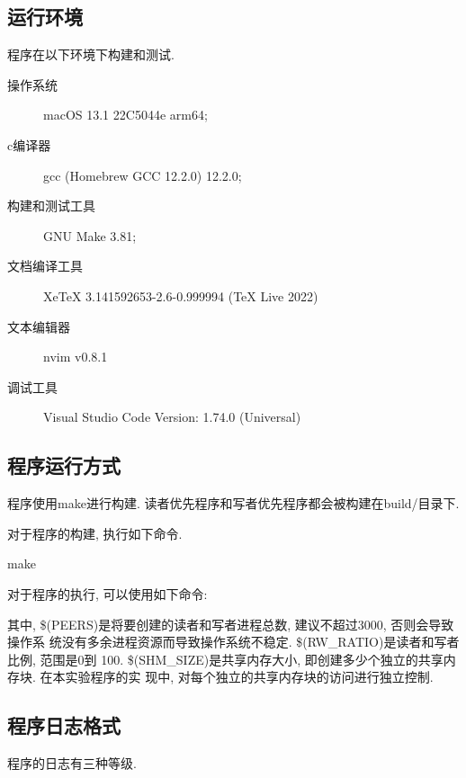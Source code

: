 \subsection{运行环境}
程序在以下环境下构建和测试.
\begin{description}
    \item[操作系统] macOS 13.1 22C5044e arm64;
    \item[c编译器] gcc (Homebrew GCC 12.2.0) 12.2.0;
    \item[构建和测试工具] GNU Make 3.81;
    \item[文档编译工具] XeTeX 3.141592653-2.6-0.999994 (TeX Live 2022)
    \item[文本编辑器] nvim v0.8.1
    \item[调试工具] Visual Studio Code Version: 1.74.0 (Universal)
\end{description}

\subsection{程序运行方式}
程序使用make进行构建. 读者优先程序和写者优先程序都会被构建在build/目录下.\par
对于程序的构建, 执行如下命令.
\begin{code}
    make
\end{code}

对于程序的执行, 可以使用如下命令:

其中, \$(PEERS)是将要创建的读者和写者进程总数, 建议不超过3000, 否则会导致操作系
统没有多余进程资源而导致操作系统不稳定. \$(RW\_RATIO)是读者和写者比例, 范围是0到
100. \$(SHM\_SIZE)是共享内存大小, 即创建多少个独立的共享内存块. 在本实验程序的实
现中, 对每个独立的共享内存块的访问进行独立控制.

\subsection{程序日志格式}
程序的日志有三种等级.\par

